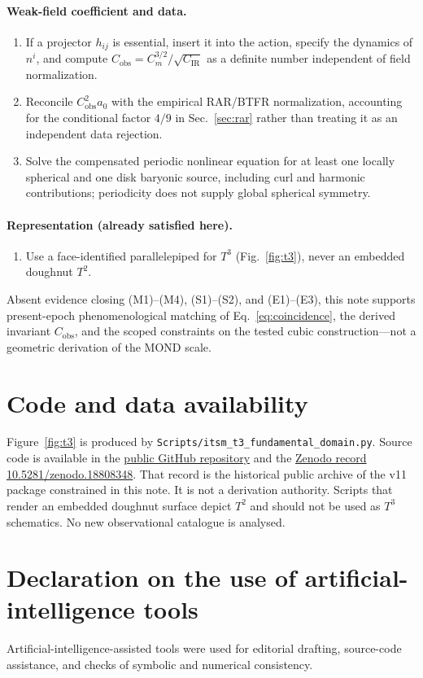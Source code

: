 \documentclass[aps,prd,reprint,superscriptaddress,nofootinbib,floatfix,showkeys]{revtex4-2}
\newcommand{\Tthree}{T^{3}}
\newcommand{\Ttwo}{T^{2}}
\newcommand{\Cobs}{C_{\mathrm{obs}}}
\newcommand{\Cm}{C_{m}}
\newcommand{\CIR}{C_{\mathrm{IR}}}
\newcommand{\azero}{a_{0}}
\begin{document}
\paragraph{Weak-field coefficient and data.}
\begin{enumerate}
\item[(E1)] If a projector \(h_{ij}\) is essential, insert it into the action,
  specify the dynamics of \(n^{i}\), and compute
  \(\Cobs=\Cm^{3/2}/\sqrt{\CIR}\)
  as a definite number independent of field normalization.
\item[(E2)] Reconcile \(\Cobs^{2}\azero\) with the empirical RAR/BTFR
  normalization, accounting for the conditional factor \(4/9\) in
  Sec.~\ref{sec:rar} rather than treating it as an independent data rejection.
\item[(E3)] Solve the compensated periodic nonlinear equation for at least one
  locally spherical and one disk baryonic source, including curl and harmonic
  contributions; periodicity does not supply global spherical symmetry.
\end{enumerate}

\paragraph{Representation (already satisfied here).}
\begin{enumerate}
\item[(R1)] Use a face-identified parallelepiped for \(\Tthree\)
  (Fig.~\ref{fig:t3}), never an embedded doughnut \(\Ttwo\).
\end{enumerate}

Absent evidence closing (M1)--(M4), (S1)--(S2), and (E1)--(E3), this note
supports present-epoch phenomenological matching of
Eq.~\eqref{eq:coincidence}, the derived invariant \(\Cobs\), and the scoped
constraints on the tested cubic construction---not a geometric derivation of
the MOND scale.

\section*{Code and data availability}

\begingroup
\raggedright
Figure~\ref{fig:t3} is produced by
\texttt{Scripts/itsm\_t3\_fundamental\_domain.py}.
Source code is available in the
\href{https://github.com/brendohxd/ITSM-Integrated-Toroidal-Syntropic-Model}{public GitHub repository}
and the \href{https://doi.org/10.5281/zenodo.18808348}{Zenodo record 10.5281/zenodo.18808348}.
That record is the historical public archive of the v11 package
constrained in this note. It is not a derivation authority.
Scripts that render an embedded doughnut surface depict \(\Ttwo\) and should
not be used as \(\Tthree\) schematics.  No new observational catalogue is
analysed.
\par
\endgroup

\section*{Declaration on the use of artificial-intelligence tools}

Artificial-intelligence-assisted tools were used for editorial drafting,
source-code assistance, and checks of symbolic and numerical consistency.


\end{document}
